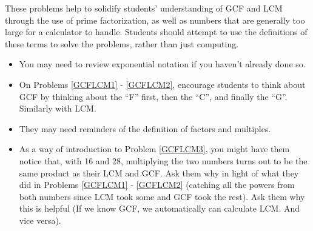 \documentclass{ximera}
\begin{document}
\begin{instructorNotes}
These problems help to solidify students' understanding of GCF and LCM through the use of prime factorization, as well as numbers that are generally too large for a calculator to handle.  Students should attempt to use the definitions of these terms to solve the problems, rather than just computing.

\begin{itemize}
    \item You may need to review exponential notation if you haven't already done so.
	\item On Problems \ref{GCFLCM1} - \ref{GCFLCM2}, encourage students to think about GCF by thinking about the ``F'' first, then the ``C'', and finally the ``G''.  Similarly with LCM.
	\item They may need reminders of the definition of factors and multiples.
	\item As a way of introduction to Problem \ref{GCFLCM3}, you might have them notice that, with 16 and 28, multiplying the two numbers turns out to be the same product as their LCM and GCF.  Ask them why in light of what they did in Problems \ref{GCFLCM1} - \ref{GCFLCM2} (catching all the powers from both numbers since LCM took some and GCF took the rest).  Ask them why this is helpful (If we know GCF, we automatically can calculate LCM.  And vice versa).
\end{itemize}
\end{instructorNotes}
\end{document}
